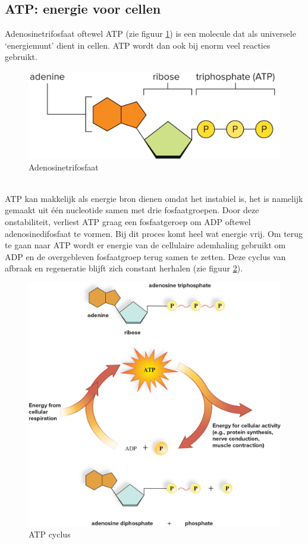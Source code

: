 \documentclass[a4paper,kul]{kulakarticle} %
\begin{document}
\subsection{ATP: energie voor cellen}
Adenosinetrifosfaat oftewel ATP (zie figuur \ref{fig:atp}) is een molecule dat als universele `energiemunt' dient in cellen. ATP wordt dan ook bij enorm veel reacties gebruikt.
\begin{figure}[h]
	\centering
	\includegraphics[width=0.7\linewidth]{ATP}
	\caption[APT]{Adenosinetrifosfaat}
	\label{fig:atp}
\end{figure}\\
ATP kan makkelijk als energie bron dienen omdat het instabiel is, het is namelijk gemaakt uit één nucleotide samen met drie fosfaatgroepen. Door deze onstabiliteit, verliest ATP graag een fosfaatgeroep om ADP oftewel adenosinedifosfaat te vormen. Bij dit proces komt heel wat energie vrij. Om terug te gaan naar ATP wordt er energie van de cellulaire ademhaling gebruikt om ADP en de overgebleven fosfaatgroep terug samen te zetten. Deze cyclus van afbraak en regeneratie blijft zich constant herhalen (zie figuur \ref{fig:atpcycle}).
\begin{figure}[h]
	\centering
	\includegraphics[width=0.7\linewidth]{ATPcycle}
	\caption[ATP cylcus]{ATP cyclus}
	\label{fig:atpcycle}
\end{figure}
\end{document}
